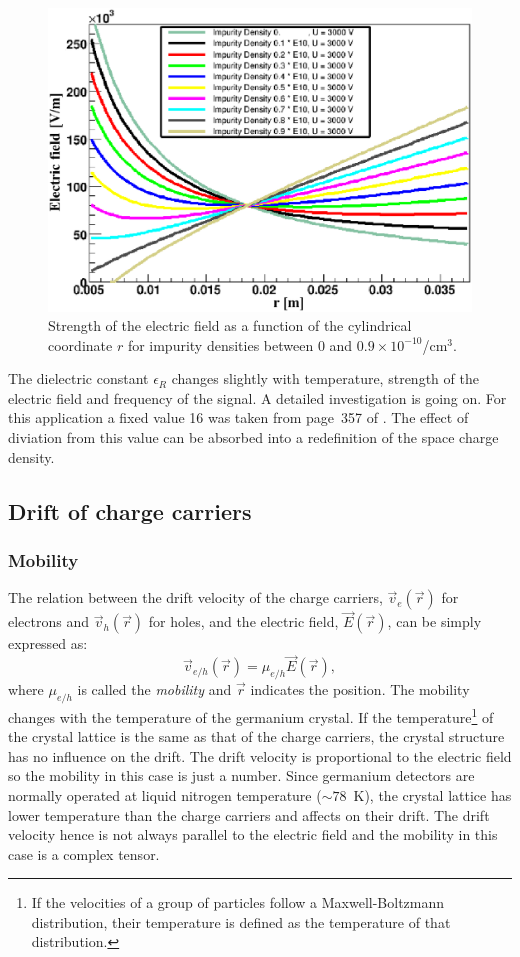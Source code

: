 \documentclass[epj]{svjour}
\begin{document}
\begin{figure}[htbp]
\centering
\includegraphics[width=\linewidth]{rho} 
\caption{Strength of the electric field as a function of the
cylindrical coordinate $r$ for impurity densities between 0 and $0.9
\times 10^{-10}$/cm$^{3}$.}
\label{f:rho} 
\end{figure}

The dielectric constant $\epsilon_{R}$ changes slightly with
temperature, strength of the electric field and frequency of the
signal. A detailed investigation is going on. For this application a
fixed value 16 was taken from page~357 of \cite{Kno99}. The effect of
diviation from this value can be absorbed into a redefinition of the
space charge density.

\subsection{Drift of charge carriers} 
\label{s:drift} 
\subsubsection{Mobility} 
\label{s:mobi} 
The relation between the drift velocity of the charge carriers,
$\vec{v}_{e}(\vec{r})$ for electrons and $\vec{v}_{h}(\vec{r})$ for
holes, and the electric field, $\vec{E}(\vec{r})$, can be simply
expressed as:
\begin{equation} 
\label{e:dv}
\vec{v}_{e/h} (\vec{r})= \mu_{e/h} \vec{E}(\vec{r}),
\end{equation}
where $\mu_{e/h}$ is called the \emph{mobility} and $\vec{r}$
indicates the position. The mobility changes with the temperature of
the germanium crystal. If the temperature\footnote{If the velocities
of a group of particles follow a Maxwell-Boltzmann distribution, their
temperature is defined as the temperature of that distribution.} of
the crystal lattice is the same as that of the charge carriers, the
crystal structure has no influence on the drift. The drift velocity is
proportional to the electric field so the mobility in this case is
just a number. Since germanium detectors are normally operated at
liquid nitrogen temperature ($\sim78$~K), the crystal lattice has
lower temperature than the charge carriers and affects on their
drift. The drift velocity hence is not always parallel to the electric
field and the mobility in this case is a complex tensor.
\end{document}
